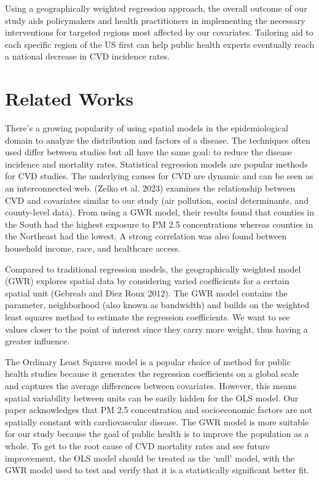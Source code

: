 \documentclass[
]{article}
\begin{document}
Using a geographically weighted regression approach, the overall outcome
of our study aids policymakers and health practitioners in implementing
the necessary interventions for targeted regions most affected by our
covariates. Tailoring aid to each specific region of the US first can
help public health experts eventually reach a national decrease in CVD
incidence rates.

\section{Related Works}\label{related-works}

There's a growing popularity of using spatial models in the
epidemiological domain to analyze the distribution and factors of a
disease. The techniques often used differ between studies but all have
the same goal: to reduce the disease incidence and mortality rates.
Statistical regression models are popular methods for CVD studies. The
underlying causes for CVD are dynamic and can be seen as an
interconnected web. (Zelko et al. 2023) examines the relationship
between CVD and covariates similar to our study (air pollution, social
determinants, and county-level data). From using a GWR model, their
results found that counties in the South had the highest exposure to PM
2.5 concentrations whereas counties in the Northeast had the lowest. A
strong correlation was also found between household income, race, and
healthcare access.~

Compared to traditional regression models, the geographically weighted
model (GWR) explores spatial data by considering varied coefficients for
a certain spatial unit (Gebreab and Diez Roux 2012). The GWR model
contains the parameter, neighborhood (also known as bandwidth) and
builds on the weighted least squares method to estimate the regression
coefficients. We want to see values closer to the point of interest
since they carry more weight, thus having a greater influence.~

The Ordinary Least Squares model is a popular choice of method for
public health studies because it generates the regression coefficients
on a global scale and captures the average differences between
covariates. However, this means spatial variability between units can be
easily hidden for the OLS model. Our paper acknowledges that PM 2.5
concentration and socioeconomic factors are not spatially constant with
cardiovascular disease. The GWR model is more suitable for our study
because the goal of public health is to improve the population as a
whole. To get to the root cause of CVD mortality rates and see future
improvement, the OLS model should be treated as the `null' model, with
the GWR model used to test and verify that it is a statistically
significant better fit.
\end{document}

